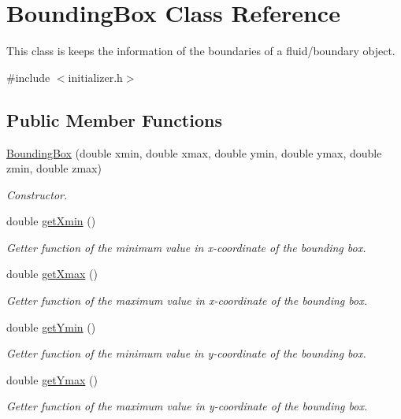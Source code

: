 \hypertarget{classBoundingBox}{\section{Bounding\-Box Class Reference}
\label{classBoundingBox}
}


This class is keeps the information of the boundaries of a fluid/boundary object.  




{\ttfamily \#include $<$initializer.\-h$>$}

\subsection*{Public Member Functions}
\begin{DoxyCompactItemize}
\item 
\hyperlink{classBoundingBox_a4bc1c7c4c194847a406dea3c367d427e}{Bounding\-Box} (double xmin, double xmax, double ymin, double ymax, double zmin, double zmax)
\begin{DoxyCompactList}\small\item\em Constructor. \end{DoxyCompactList}\item 
double \hyperlink{classBoundingBox_a5f09f2bd4eae49e7fb7264027031d887}{get\-Xmin} ()
\begin{DoxyCompactList}\small\item\em Getter function of the minimum value in x-\/coordinate of the bounding box. \end{DoxyCompactList}\item 
double \hyperlink{classBoundingBox_a7ebcceabd35015231631eeaff865c0ad}{get\-Xmax} ()
\begin{DoxyCompactList}\small\item\em Getter function of the maximum value in x-\/coordinate of the bounding box. \end{DoxyCompactList}\item 
double \hyperlink{classBoundingBox_ab9c8264adcb6d57abf83f0629df02533}{get\-Ymin} ()
\begin{DoxyCompactList}\small\item\em Getter function of the minimum value in y-\/coordinate of the bounding box. \end{DoxyCompactList}\item 
double \hyperlink{classBoundingBox_ae99a1b8ae26d6463211abe47e2f25fd8}{get\-Ymax} ()
\begin{DoxyCompactList}\small\item\em Getter function of the maximum value in y-\/coordinate of the bounding box. \end{DoxyCompactList}\item 

\end{DoxyCompactItemize}
